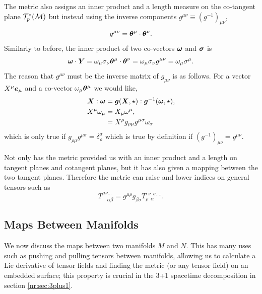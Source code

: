 The metric also assigns an inner product and a length measure on the co-tangent plane $\mathcal{T}^*_p(\mathcal{M})$ but instead using the inverse components $g^{\mu\nu} \equiv (g^{-1})_{\mu\nu}$,
\begin{equation}
g^{\mu\nu} = \boldsymbol{\theta}^\mu \cdot \boldsymbol{\theta}^\nu.
\end{equation}
Similarly to before, the inner product of two co-vectors $\boldsymbol{\omega}$ and $\boldsymbol{\sigma}$ is
\begin{equation}
\boldsymbol{\omega} \cdot \boldsymbol{Y} = \omega_\mu \sigma_\nu \boldsymbol{\theta}^\mu \cdot \boldsymbol{\theta}^\nu = \omega_\mu \sigma_\nu g^{\mu\nu} = \omega_\mu \sigma^\mu.
\end{equation}
The reason that $g^{\mu\nu}$ must be the inverse matrix of $g_{\mu\nu}$ is as follows. For a vector $X^\mu \boldsymbol{e}_\mu$ and a co-vector $\omega_\mu \boldsymbol{\theta}^\mu$ we would like,
\begin{align}
\boldsymbol{X} : \boldsymbol{\omega} &= \boldsymbol{g}(\boldsymbol{X},\star) : \boldsymbol{g}^{-1}(\boldsymbol{\omega},\star) ,\\
X^\mu \omega_\mu  &= X_\mu \omega^\mu ,\\
&= X^\rho g_{\rho\mu}g^{\mu\sigma} \omega_\sigma
\end{align}
which is only true if $g_{\rho\mu}g^{\mu\sigma} = \delta^\sigma_\rho$ which is true by definition if $(g^{-1})_{\mu\nu} = g^{\mu\nu}$.

Not only has the metric provided us with an inner product and a length on tangent planes and cotangent planes, but it has also given a mapping between the two tangent planes. Therefore the metric can raise and lower indices on general tensors such as
\begin{equation}
T^{\mu\nu ...}_{\,\,\,\,\,\, \alpha \beta} = g^{\mu\rho}g_{\beta\sigma}T^{\,\,\, \nu \,\,\, \sigma ....}_{\rho \,\,\, \alpha}.
\end{equation}



\subsection{Maps Between Manifolds}\label{intro:sect:map}
We now discuss the maps between two manifolds $M$ and $N$. This has many uses such as pushing and pulling tensors between manifolds, allowing us to calculate a Lie derivative of tensor fields and finding the metric (or any tensor field) on an embedded surface; this property is crucial in the 3+1 spacetime decomposition in section \ref{nr:sec:3plus1}.


